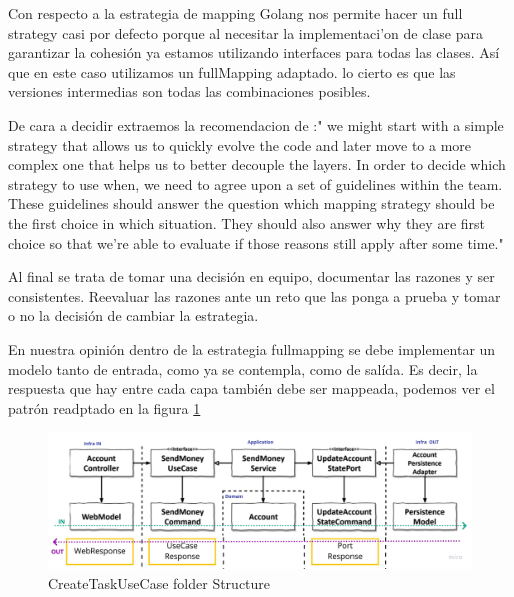 
Con respecto a la estrategia de mapping Golang nos permite hacer un full strategy casi por defecto porque al necesitar la implementaci'on de clase para garantizar la cohesión ya estamos utilizando interfaces para todas las clases. Así que en este caso utilizamos un fullMapping adaptado. lo cierto es que las versiones intermedias son todas las combinaciones posibles.

De cara a decidir extraemos la recomendacion de  \cite{TomHombergs2019GYHD}:"
we might start with a simple strategy that allows us to quickly evolve the code and later move to a more complex one that helps us to better decouple the layers.
In order to decide which strategy to use when, we need to agree upon a set of guidelines within the team. These guidelines should answer the question which mapping strategy should be the first choice in which situation. They should also answer why they are first choice so that we’re able to evaluate if those reasons still apply after some time."

Al final se trata de tomar una decisión en equipo, documentar las razones y ser consistentes. Reevaluar las razones ante un reto que las ponga a prueba y tomar o no la decisión de cambiar la estrategia.

En nuestra opinión dentro de la estrategia fullmapping se debe implementar un modelo tanto de entrada, como ya se contempla, como de salída. Es decir, la respuesta que hay entre cada capa también debe ser mappeada, podemos ver el patrón readptado en la figura \ref{fig:GetHandMapping}

\begin{figure}[H]
    \centering
    \includegraphics[height=0.2\textheight]{./part/Ejecucion/Seguimiento/CreateTaskUseCase/img/PFM - GetHandMapping}
    \caption{CreateTaskUseCase folder Structure\cite{TomHombergs2019GYHD}}\label{fig:GetHandMapping}
\end{figure}

